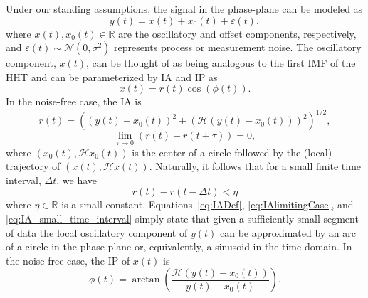 \documentclass[journal,11pt,a4paper,onecolumn,draftcls]{IEEEtran}
\begin{document}
Under our standing assumptions, the signal in the phase-plane can be modeled as
\begin{equation}\label{eq:SignalModel}
y\left( t \right) = x\left( t \right) + x_0\left( t \right) + \varepsilon \left( t \right),
\end{equation}
where $x(t),x_0(t) \in \mathbb{R}$ are the oscillatory and offset components, respectively, and $\varepsilon(t) \sim \mathcal{N}(0,\sigma^2)$ represents process or measurement noise. The oscillatory component, $x(t)$, can be thought of as being analogous to the first IMF of the HHT and can be parameterized by IA and IP as
\begin{equation}\label{eq:InstAmplitudeAndPhase}
    x\left( t \right) = r\left( t \right)\cos \left( {\phi \left( t \right)} \right).
\end{equation}
In the noise-free case, the IA is
\begin{equation}\label{eq:IADef}
    r\left( t \right) = \left( \left( y\left( t \right) - x_0\left( t \right) \right)^2 + \left( \mathcal{H}\left( y\left( t \right) - x_0\left( t \right) \right) \right)^2\right)^{1/2},
\end{equation}
\begin{equation}\label{eq:IAlimitingCase}
\mathop {\lim }\limits_{\tau  \to 0} \left( r\left( t \right) - r\left( t + \tau \right) \right) = 0,
\end{equation}
where $\left(x_0(t), \mathcal{H}x_0(t)\right)$ is the center of a circle followed by the (local) trajectory of $\left(x(t), \mathcal{H}x(t)\right)$. Naturally, it follows that for a small finite time interval, $\Delta t$, we have
\begin{equation}\label{eq:IA_small_time_interval}
    r(t)-r(t-\Delta t) < \eta
\end{equation}
where $\eta \in \mathbb{R}$ is a small constant. Equations~\ref{eq:IADef}, \ref{eq:IAlimitingCase}, and \ref{eq:IA_small_time_interval} simply state that given a sufficiently small segment of data the local oscillatory component of $y(t)$ can be approximated by an arc of a circle in the phase-plane or, equivalently, a sinusoid in the time domain. In the noise-free case, the IP of $x(t)$ is
\begin{equation}\label{IPdef}
    \phi \left( t \right) = \arctan \left( \frac{\mathcal{H}\left( y\left( t \right) - x_0\left( t \right) \right)}
    {y\left( t \right) - x_0\left( t \right)} \right).
\end{equation}
\end{document}
